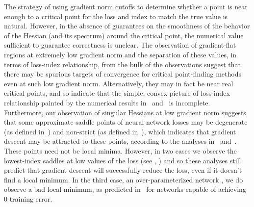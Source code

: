 \documentclass[../../thesis.tex]{subfiles}
\begin{document}
The strategy of using gradient norm cutoffs to determine
whether a point is near enough to a critical point
for the loss and index to match the true value is natural.
However, in the absence of guarantees on the smoothness of the behavior of
the Hessian (and its spectrum) around the critical point,
the numerical value sufficient to guarantee correctness is unclear.
The observation of gradient-flat regions at extremely low
gradient norm and the separation of these values,
in terms of loss-index relationship,
from the bulk of the observations
suggest that there may be spurious targets
of convergence for critical point-finding methods
even at such low gradient norm.
Alternatively, they may in fact be near real critical points,
and so indicate that the simple, convex picture of loss-index relationship
painted by the numerical results in~\cite{dauphin2014} and~\cite{pennington2017}
is incomplete.
Furthermore, our observation of singular Hessians
at low gradient norm
suggests that some approximate saddle points of neural network losses
may be degenerate (as defined in~\cite{jin2018a})
and non-strict (as defined in~\cite{lee2016}),
which indicates that gradient descent may be attracted to these points,
according to the analyses in~\cite{jin2018a} and~\cite{lee2016}.
These points need not be local minima.
However, in two cases we observe the lowest-index saddles at low values of the loss
(see , )
and so these analyses still predict that gradient descent will
successfully reduce the loss,
even if it doesn't find a local minimum.
In the third case,
an over-parameterized network ,
we do observe a bad local minimum,
as predicted in~\cite{ding2019}
for networks capable of achieving 0 training error.
\end{document}
